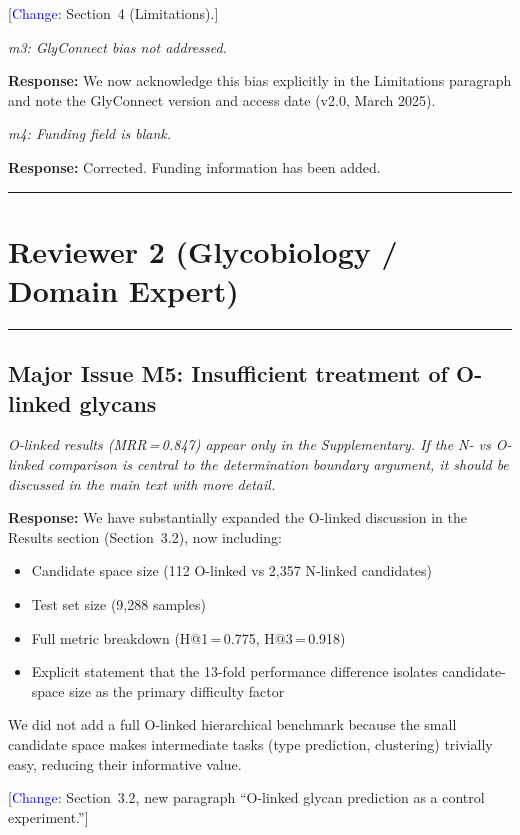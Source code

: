 \documentclass[11pt,a4paper]{article}
\newcommand{\reviewercomment}[1]{\textit{\color{black!70}#1}}
\newcommand{\response}[1]{\textbf{Response:} #1}
\newcommand{\change}[1]{[\textcolor{blue}{Change:} #1]}
\begin{document}
\change{Section~4 (Limitations).}

\reviewercomment{m3: GlyConnect bias not addressed.}

\response{We now acknowledge this bias explicitly in the Limitations paragraph
and note the GlyConnect version and access date (v2.0, March 2025).}

\reviewercomment{m4: Funding field is blank.}

\response{Corrected. Funding information has been added.}

\vspace{1em}
\noindent\rule{\linewidth}{0.8pt}

\section*{Reviewer 2 (Glycobiology / Domain Expert)}
\noindent\rule{\linewidth}{0.4pt}

\subsection*{Major Issue M5: Insufficient treatment of O-linked glycans}

\reviewercomment{O-linked results (MRR\,=\,0.847) appear only in the
Supplementary. If the N- vs O-linked comparison is central to the determination
boundary argument, it should be discussed in the main text with more detail.}

\response{We have substantially expanded the O-linked discussion in the Results
section (Section~3.2), now including:
\begin{itemize}[nosep]
  \item Candidate space size (112 O-linked vs 2,357 N-linked candidates)
  \item Test set size (9,288 samples)
  \item Full metric breakdown (H@1\,=\,0.775, H@3\,=\,0.918)
  \item Explicit statement that the 13-fold performance difference isolates
        candidate-space size as the primary difficulty factor
\end{itemize}
We did not add a full O-linked hierarchical benchmark because the small
candidate space makes intermediate tasks (type prediction, clustering) trivially
easy, reducing their informative value.}

\change{Section~3.2, new paragraph ``O-linked glycan prediction as a control
experiment.''}
\end{document}
